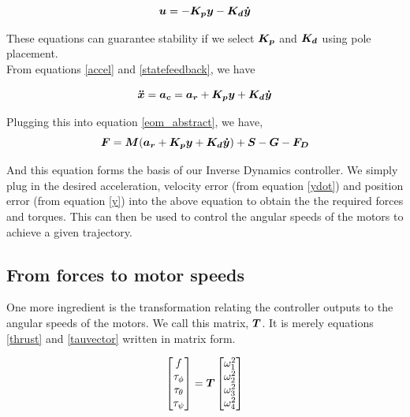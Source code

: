 \documentclass[12pt,fleqn]{article}
\newcommand{\mbm}[1]{\mbox{\boldmath $#1$}}
\begin{document}
\begin{equation} \label{statefeedback}
$$ \mbm{u} = -\mbm{K_p}\mbm{y} - \mbm{K_d}\mbm{\dot{y}} $$
\end{equation}

These equations can guarantee stability if we select $\mbm{K_p}$ and
$\mbm{K_d}$ using pole placement.\\

From equations \ref{accel} and \ref{statefeedback}, we have

$$ \mbm{\ddot{x}} = \mbm{a_c} = \mbm{a_r} + \mbm{K_p}\mbm{y} +
\mbm{K_d}\mbm{\dot{y}} $$

Plugging this into equation \ref{eom_abstract}, we have,
\begin{equation} \label{eom_id}
$$ \mbm{F} = \mbm{M}(\mbm{a_r} + \mbm{K_p}\mbm{y} +
\mbm{K_d}\mbm{\dot{y}}) + \mbm{S} -\mbm{G} - \mbm{F_D} $$
\end{equation}

And this equation forms the basis of our Inverse Dynamics
controller. We simply plug in the desired acceleration, velocity error
(from equation \ref{ydot}) and position error (from
equation \ref{y}) into the above equation to obtain the the required
forces and torques. This can then be used to control the angular
speeds of the motors to achieve a given trajectory. \\ 

\subsection{From forces to motor speeds}

One more ingredient is the transformation relating the controller
outputs to the angular speeds of the motors. We call this matrix,
$\mbm{T}$. It is merely equations \ref{thrust} and \ref{tauvector} written in
matrix form.

\begin{equation} \label{force_to_omega}
$$ \begin{bmatrix} f \\ \tau_\phi \\ \tau_\theta \\
  \tau_\psi \end{bmatrix}  = \mbm{T} \begin{bmatrix} \omega_1^2 \\
  \omega_2^2 \\ \omega_3^2 \\ \omega_4^2 \end{bmatrix}$$
\end{equation}
\end{document}
